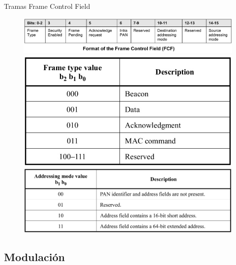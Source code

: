 \documentclass[aspectratio=169]{beamer}
\begin{document}
\begin{frame}[t]{Tramas}
Frame Control Field
	\begin{figure}[H]
	\centering
		\includegraphics[height=.3\textheight]{./imagenes/FCF.jpg}\\
		\vspace{20px}
		\includegraphics[height=.3\textheight]{./imagenes/frametype.jpg}
		\hspace{20px} 
		\includegraphics[height=.3\textheight]{./imagenes/addressingmode.jpg}
	\end{figure} 	
\end{frame}


\subsection[Modulación]{Modulación}
\end{document}
